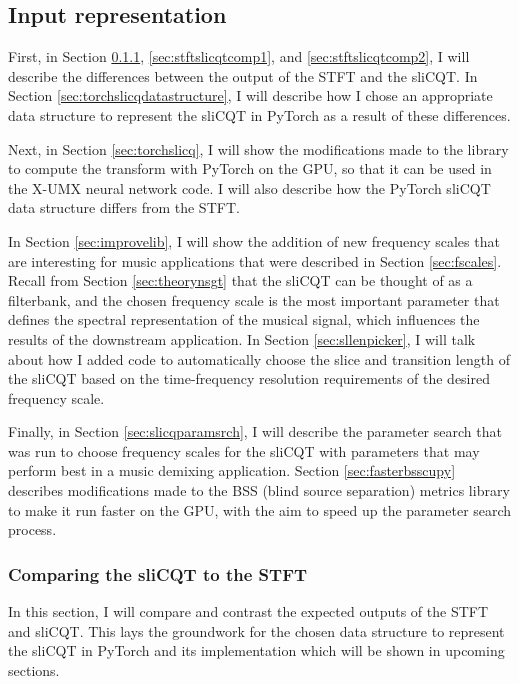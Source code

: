 \documentclass[report.tex]{subfiles}
\begin{document}
\subsection{Input representation}
\label{sec:inputrepresentation}

First, in Section \ref{sec:stftslicqtcomp}, \ref{sec:stftslicqtcomp1}, and \ref{sec:stftslicqtcomp2}, I will describe the differences between the output of the STFT and the sliCQT. In Section \ref{sec:torchslicqdatastructure}, I will describe how I chose an appropriate data structure to represent the sliCQT in PyTorch as a result of these differences.

Next, in Section \ref{sec:torchslicq}, I will show the modifications made to the library to compute the transform with PyTorch on the GPU, so that it can be used in the X-UMX neural network code. I will also describe how the PyTorch sliCQT data structure differs from the STFT.

In Section \ref{sec:improvelib}, I will show the addition of new frequency scales that are interesting for music applications that were described in Section \ref{sec:fscales}. Recall from Section \ref{sec:theorynsgt} that the sliCQT can be thought of as a filterbank, and the chosen frequency scale is the most important parameter that defines the spectral representation of the musical signal, which influences the results of the downstream application. In Section \ref{sec:sllenpicker}, I will talk about how I added code to automatically choose the slice and transition length of the sliCQT based on the time-frequency resolution requirements of the desired frequency scale.

Finally, in Section \ref{sec:slicqparamsrch}, I will describe the parameter search that was run to choose frequency scales for the sliCQT with parameters that may perform best in a music demixing application. Section \ref{sec:fasterbsscupy} describes modifications made to the BSS (blind source separation) metrics library to make it run faster on the GPU, with the aim to speed up the parameter search process.

\subsubsection{Comparing the sliCQT to the STFT}
\label{sec:stftslicqtcomp}

In this section, I will compare and contrast the expected outputs of the STFT and sliCQT. This lays the groundwork for the chosen data structure to represent the sliCQT in PyTorch and its implementation which will be shown in upcoming sections.
\end{document}
